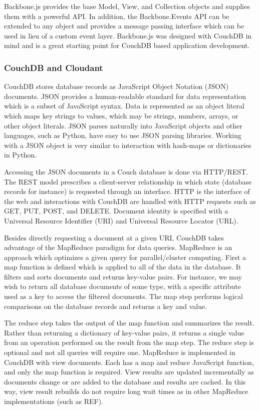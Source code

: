 \documentclass[journal]{IEEEtran}
\begin{document}
Backbone.js provides the base Model, View, and Collection objects and supplies them with a powerful API.
In addition, the Backbone.Events API can be extended to any object and provides a message passing interface
which can be used in lieu of a custom event layer. Backbone.js was designed with CouchDB in mind and is
a great starting point for CouchDB based application development.

\subsubsection{CouchDB and Cloudant}
CouchDB stores database records as JavaScript Object Notation (JSON) documents. JSON provides a human-readable
standard for data representation which is a subset of JavaScript syntax. Data is represented as an object
literal which maps key strings to values, which may be strings, numbers, arrays, or other object literals. 
JSON parses naturally into JavaScript objects and other languages, such as Python, have easy to use
JSON parsing libraries. Working with a JSON object is very similar to interaction with hash-maps or 
dictionaries in Python.

Accessing the JSON documents in a Couch database is done via HTTP/REST. The REST model prescribes a client-server
relationship in which state (database records for instance) is requested through an interface.
HTTP is the interface of the web and interactions with CouchDB are handled with HTTP
requests such as GET, PUT, POST, and DELETE. Document identity is specified with a Universal Resource Identifier (URI)
and Universal Resource Locator (URL).

Besides directly requesting a document at a given URI, CouchDB takes advantage of the MapReduce paradigm for data
queries. MapReduce is an approach which optimizes a given query for parallel/cluster computing. First a map function
is defined which is applied to all of the data in the database. It filters and sorts documents and returns key-value
pairs. For instance, we may wish to return all database documents of some type, with a specific attribute used as
a key to access the filtered documents. The map step performs logical comparisons on the database records and
returns a key and value.

The reduce step takes the output of the map function and summarizes the result. Rather than returning a dictionary
of key-value pairs, it returns a single value from an operation performed on the result from the map step. The reduce
step is optional and not all queries will require one. MapReduce is implemented in CouchDB with view documents. Each has
a map and reduce JavaScript function, and only the map function is required. View results are updated incrementally as
documents change or are added to the database and results are cached. In this way, view result rebuilds do not require
long wait times as in other MapReduce implementations (such as REF).
\end{document}
